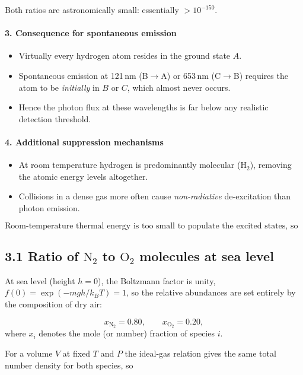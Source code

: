 \documentclass[12pt]{article}
\theoremstyle{definition} %
\theoremstyle{plain} %
\begin{document}
Both ratios are astronomically small: essentially \(\!>10^{-150}\).

\paragraph{3.  Consequence for spontaneous emission}

\begin{itemize}
  \item Virtually every hydrogen atom resides in the ground state \(A\).
  \item Spontaneous emission at 121\,nm (B\(\!\to\)A) or 653\,nm (C\(\!\to\)B)
        requires the atom to be \emph{initially} in \(B\) or \(C\),
        which almost never occurs.
  \item Hence the photon flux at these wavelengths is far below any
        realistic detection threshold.
\end{itemize}

\paragraph{4.  Additional suppression mechanisms}

\begin{itemize}
  \item At room temperature hydrogen is predominantly molecular
        (\(\mathrm{H_2}\)), removing the atomic energy levels altogether.
  \item Collisions in a dense gas more often cause
        \emph{non-radiative} de-excitation than photon emission.
\end{itemize}

\[
  \boxed{\text{Room-temperature thermal energy is too small to populate the excited states, so no detectable line emission occurs.}}
\]
\subsection*{3.1  Ratio of \(\mathrm{N_2}\) to \(\mathrm{O_2}\) molecules at sea level}

At sea level (height \(h=0\)), the Boltzmann factor is unity,
\(f(0)=\exp(-mgh/k_BT)=1\),
so the relative abundances are set entirely by the
composition of dry air:

\[
  x_{\mathrm{N_2}} = 0.80,
  \qquad
  x_{\mathrm{O_2}} = 0.20,
\]
where \(x_i\) denotes the mole (or number) fraction of species \(i\).

For a volume \(V\) at fixed \(T\) and \(P\)
the ideal-gas relation gives the same total number density for both
species, so
\end{document}
